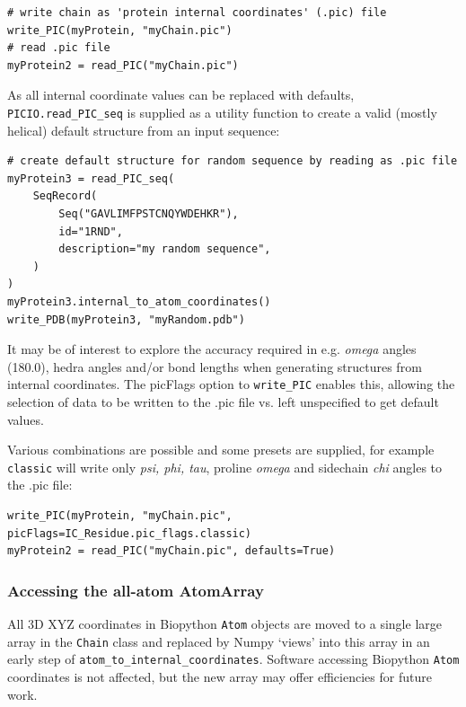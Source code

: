 \begin{verbatim}
# write chain as 'protein internal coordinates' (.pic) file
write_PIC(myProtein, "myChain.pic")
# read .pic file
myProtein2 = read_PIC("myChain.pic")
\end{verbatim}

As all internal coordinate values can be replaced with defaults, \texttt{PICIO.read\_PIC\_seq\(\)} is
supplied as a utility function to create a valid (mostly helical) default structure from an input
sequence:

\begin{verbatim}
# create default structure for random sequence by reading as .pic file
myProtein3 = read_PIC_seq(
    SeqRecord(
        Seq("GAVLIMFPSTCNQYWDEHKR"),
        id="1RND",
        description="my random sequence",
    )
)
myProtein3.internal_to_atom_coordinates()
write_PDB(myProtein3, "myRandom.pdb")
\end{verbatim}
    
It may be of interest to explore the accuracy required in e.g. \textit{omega} angles (180.0), hedra angles
and/or bond lengths when generating structures from internal coordinates.  The picFlags
option to \texttt{write\_PIC\(\)} enables this, allowing the selection of data to be written
to the .pic file vs. left unspecified to get default values.  

Various combinations are possible and some presets are supplied, for example \texttt{classic}
will write only \textit{psi, phi, tau}, proline \textit{omega} and sidechain \textit{chi}
angles to the .pic file:

\begin{verbatim}
write_PIC(myProtein, "myChain.pic", picFlags=IC_Residue.pic_flags.classic)
myProtein2 = read_PIC("myChain.pic", defaults=True)
\end{verbatim}

\subsubsection{Accessing the all-atom AtomArray}

All 3D XYZ coordinates in Biopython \texttt{Atom} objects are moved to a single large array
in the \texttt{Chain} class and replaced by Numpy `views' into this array in an early step of
\texttt{atom\_to\_internal\_coordinates\(\)}.  Software accessing Biopython \texttt{Atom} coordinates
is not affected, but the new array may offer efficiencies for future work.  

